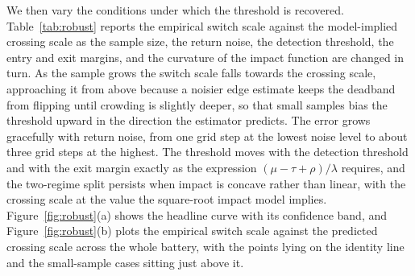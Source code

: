 \documentclass[11pt]{article}
\theoremstyle{plain}
\theoremstyle{definition}
\begin{document}
We then vary the conditions under which the threshold is recovered. Table~\ref{tab:robust} reports the empirical switch scale against the model-implied crossing scale as the sample size, the return noise, the detection threshold, the entry and exit margins, and the curvature of the impact function are changed in turn. As the sample grows the switch scale falls towards the crossing scale, approaching it from above because a noisier edge estimate keeps the deadband from flipping until crowding is slightly deeper, so that small samples bias the threshold upward in the direction the estimator predicts. The error grows gracefully with return noise, from one grid step at the lowest noise level to about three grid steps at the highest. The threshold moves with the detection threshold and with the exit margin exactly as the expression $(\mu-\tau+\rho)/\lambda$ requires, and the two-regime split persists when impact is concave rather than linear, with the crossing scale at the value the square-root impact model implies. Figure~\ref{fig:robust}(a) shows the headline curve with its confidence band, and Figure~\ref{fig:robust}(b) plots the empirical switch scale against the predicted crossing scale across the whole battery, with the points lying on the identity line and the small-sample cases sitting just above it.
\end{document}

